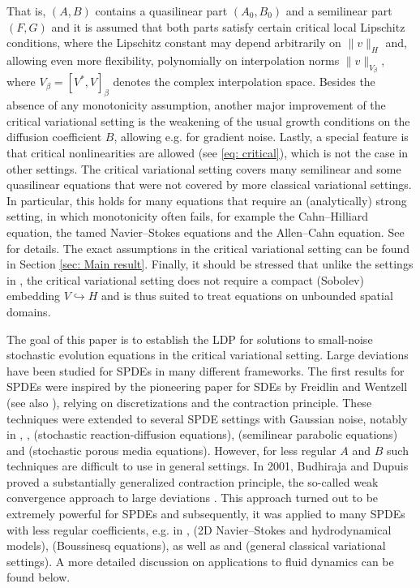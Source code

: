 \documentclass{amsart}
\newcommand{\<}{\langle}
\newcommand{\?}{\rangle}
\newcommand{\into}{\hookrightarrow}
\theoremstyle{plain}
\theoremstyle{remark}
\theoremstyle{plain}
\numberwithin{equation}{section}
\begin{document}
That is, $(A,B)$ contains a quasilinear part  $(A_0,B_0)$ and a semilinear part $(F,G)$ and it is assumed that both parts satisfy certain critical local Lipschitz conditions, where the Lipschitz constant may depend arbitrarily on $\|v\|_H$ and, allowing even more flexibility,  polynomially on interpolation norms $\|v\|_{V_\beta}$, where $V_\beta=[V^*,V]_\beta$ denotes the complex interpolation space. Besides the absence of any  monotonicity assumption, another major improvement of the critical variational setting is the weakening of the usual growth conditions on the diffusion coefficient $B$, allowing e.g. \!for gradient noise. Lastly, a special feature is that critical nonlinearities are allowed (see \eqref{eq: critical}), which is not the case in other settings. The critical variational  setting covers many semilinear and some quasilinear equations that were not covered by more classical variational settings. In particular, this holds for many equations that require an (analytically) strong setting, in which monotonicity often fails, for example the Cahn--Hilliard equation, the tamed Navier--Stokes equations and the Allen--Cahn equation. See \cite[\S 5]{AV22variational} for details. The exact assumptions in the critical variational setting can be found in Section \ref{sec: Main result}. Finally, it should be stressed that unlike the settings in \cite{rockner22}, the critical variational setting does not require a compact (Sobolev) embedding $V\into H$ and is thus suited to treat equations on unbounded spatial domains.

The goal of this paper is to establish the LDP for solutions to small-noise stochastic evolution equations in the critical variational setting. Large deviations have been studied for SPDEs in many different frameworks. The first results for SPDEs were inspired by the pioneering paper for SDEs by Freidlin and Wentzell \cite{freidlin12} (see also \cite[\S 5.6]{dembo10}), relying on discretizations and the contraction principle. These techniques were extended to several SPDE settings  with Gaussian noise, notably in \cite{daprato14}, \cite{peszat94}, \cite{cerrai04} (stochastic
reaction-diffusion equations), \cite{chow92} (semilinear parabolic equations) and \cite{rockner06} (stochastic porous media equations). However, for less regular $A$ and $B$ such techniques are difficult to use in general settings.
In 2001, Budhiraja and Dupuis proved a substantially generalized contraction principle, the so-called weak convergence approach to large deviations \cite{budhidupuis01}.  This approach turned out to be extremely powerful for SPDEs and subsequently, it was applied to many SPDEs with less regular coefficients, e.g. \!in \cite{sritharansundar06}, \cite{chueshovmillet10} (2D Navier--Stokes and hydrodynamical models), \cite{duanmillet09} (Boussinesq equations), as well as \cite{renzhang08} and \cite{liu09} (general classical variational settings). A more detailed discussion on applications to fluid dynamics can be found below. 
\end{document}
